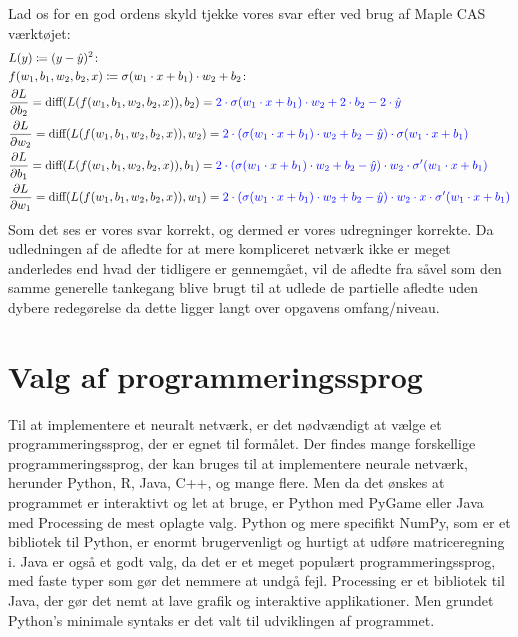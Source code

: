 \documentclass{article}
\begin{document}
Lad os for en god ordens skyld tjekke vores svar efter ved brug af Maple CAS værktøjet:
\begin{align}
  &L(y)\coloneqq(y-\hat{y})^{2}\colon\\
  &f(w_{1},b_{1},w_{2},b_{2},x)\coloneqq\sigma(w_{1}\cdot x+b_{1})\cdot w_{2}+b_{2}\colon\\
  &\frac{\partial L}{\partial b_{2}}=\text{diff}(L(f(w_{1},b_{1},w_{2},b_{2},x)),b_2)=\color{blue}2\cdot\sigma(w_{1}\cdot x+b_{1})\cdot w_{2}+2\cdot b_{2}-2\cdot\hat{y}\\
  &\frac{\partial L}{\partial w_{2}}= \text{diff}(L(f(w_{1},b_{1},w_{2},b_{2},x)),w_2)=\color{blue}2\cdot(\sigma(w_{1}\cdot x+b_{1})\cdot w_{2}+b_{2}-\hat{y})\cdot\sigma(w_{1}\cdot x+b_{1})\\
  &\frac{\partial L}{\partial b_{1}}= \text{diff}(L(f(w_{1},b_{1},w_{2},b_{2},x)),b_1)=\color{blue}2\cdot(\sigma(w_{1}\cdot x+b_{1})\cdot w_{2}+b_{2}-\hat{y})\cdot w_{2}\cdot\sigma'(w_{1}\cdot x+b_{1})\\
  &\frac{\partial L}{\partial w_{1}}= \text{diff}(L(f(w_{1},b_{1},w_{2},b_{2},x)),w_1)=\color{blue}2\cdot(\sigma(w_{1}\cdot x+b_{1})\cdot w_{2}+b_{2}-\hat{y})\cdot w_{2}\cdot x\cdot\sigma'(w_{1}\cdot x+b_{1})
\end{align}
Som det ses er vores svar korrekt, og dermed er vores udregninger korrekte. Da udledningen af de afledte for at mere kompliceret netværk ikke er meget anderledes end hvad der tidligere er gennemgået, vil de afledte fra \parencite{keita2023backpropagation,verma2020neuralnet,kurbiel2021softmax} såvel som den samme generelle tankegang blive brugt til at udlede de partielle afledte uden dybere redegørelse da dette ligger langt over opgavens omfang/niveau.
\section{Valg af programmeringssprog}
Til at implementere et neuralt netværk, er det nødvændigt at vælge et programmeringssprog, der er egnet til formålet. Der findes mange forskellige programmeringssprog, der kan bruges til at implementere neurale netværk, herunder Python, R, Java, C++, og mange flere. Men da det ønskes at programmet er interaktivt og let at bruge, er Python med PyGame eller Java med Processing de mest oplagte valg. Python og mere specifikt NumPy, som er et bibliotek til Python, er enormt brugervenligt og hurtigt at udføre matriceregning i. Java er også et godt valg, da det er et meget populært programmeringssprog, med faste typer som gør det nemmere at undgå fejl. Processing er et bibliotek til Java, der gør det nemt at lave grafik og interaktive applikationer. Men grundet Python's minimale syntaks er det valt til udviklingen af programmet.
\end{document}
